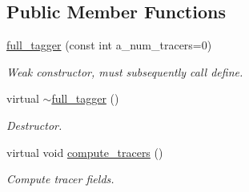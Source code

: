 \subsection*{Public Member Functions}
\begin{DoxyCompactItemize}
\item 
\hyperlink{classfull__tagger_a81800948adc0a25d0694eb1e9e5c9c62}{full\+\_\+tagger} (const int a\+\_\+num\+\_\+tracers=0)
\begin{DoxyCompactList}\small\item\em Weak constructor, must subsequently call define. \end{DoxyCompactList}\item 
virtual \hyperlink{classfull__tagger_a739f28e271a4671a65ff235187848936}{$\sim$full\+\_\+tagger} ()
\begin{DoxyCompactList}\small\item\em Destructor. \end{DoxyCompactList}\item 
virtual void \hyperlink{classfull__tagger_a5de0bb96ae96a30240997f429e6f9652}{compute\+\_\+tracers} ()
\begin{DoxyCompactList}\small\item\em Compute tracer fields. \end{DoxyCompactList}\end{DoxyCompactItemize}
